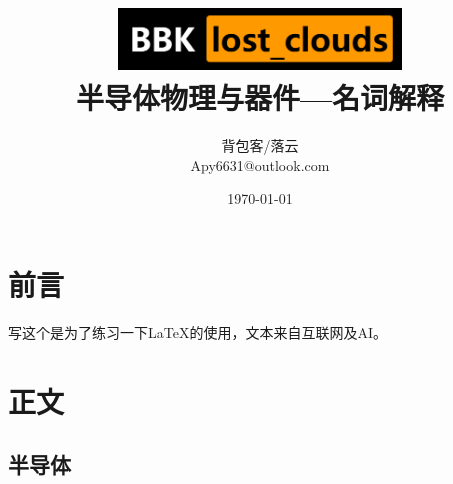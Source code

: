 \documentclass[UTF8]{ctexart}   %
\title{
    \includegraphics[width=7.91cm,height=1.64cm]{logo.png}
    \\
    \textbf{\CJKfamily{黑体}\fontsize{26pt}{39pt} 半导体物理与器件---名词解释}
}
\author{                        %
    背包客/落云\\                %
    Apy6631@outlook.com         %
}
\date{\today}                   %
\begin{document}

\maketitle                      %

\thispagestyle{empty}           %


\clearpage                      %

\thispagestyle{empty}

\tableofcontents                %


\section{前言}                  %

\begin{center}
    写这个是为了练习一下LaTeX的使用，文本来自互联网及AI。
\end{center}

\setcounter{page}{1}            %

\clearpage                      %

\section{正文}

\subsection{半导体}
\end{document}
